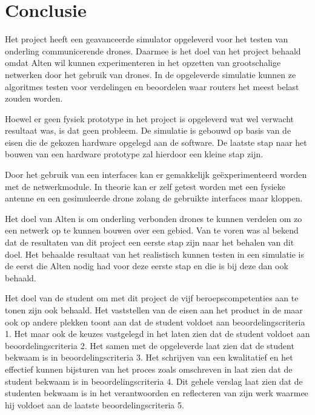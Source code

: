 \documentclass[a4paper, 11pt, oneside]{report}
\begin{document}
\chapter{Conclusie}\label{sec:conclusie}
Het project heeft een geavanceerde simulator opgeleverd voor het testen van onderling communicerende drones.
Daarmee is het doel van het project behaald omdat Alten wil kunnen experimenteren in het opzetten van grootschalige netwerken door het gebruik van drones.
In de opgeleverde simulatie kunnen ze algoritmes testen voor verdelingen en beoordelen waar routers het meest belast zouden worden.

Hoewel er geen fysiek prototype in het project is opgeleverd wat wel verwacht resultaat was, is dat geen probleem. 
De simulatie is gebouwd op basis van de eisen die de gekozen hardware opgelegd aan de software.
De laatste stap naar het bouwen van een hardware prototype zal hierdoor een kleine stap zijn.
 
Door het gebruik van een interfaces kan er gemakkelijk geëxperimenteerd worden met de netwerkmodule.
In theorie kan er zelf getest worden met een fysieke antenne en een gesimuleerde drone zolang de gebruikte interfaces maar kloppen.

Het doel van Alten is om onderling verbonden drones te kunnen verdelen om zo een netwerk op te kunnen bouwen over een gebied.
Van te voren was al bekend dat de resultaten van dit project een eerste stap zijn naar het behalen van dit doel.
Het behaalde resultaat van het realistisch kunnen testen in een simulatie is de eerst die Alten nodig had voor deze eerste stap en die is bij deze dan ook behaald.

Het doel van de student om met dit project de vijf beroepscompetenties aan te tonen zijn ook behaald. Het vaststellen van de eisen aan het product in de  maar ook op andere plekken toont aan dat de student voldoet aan beoordelingscriteria 1. Het  maar ook de keuzes vastgelegd in het  laten zien dat de student voldoet aan beoordelingscriteria 2. Het  samen met de opgeleverde  laat zien dat de student bekwaam is in beoordelingscriteria 3. Het schrijven van een kwalitatief  en het effectief kunnen bijsturen van het proces zoals omschreven in  laat zien dat de student bekwaam is in beoordelingscriteria 4.
Dit gehele verslag laat zien dat de studenten bekwaam is in het verantwoorden en reflecteren van zijn werk waarmee hij voldoet aan de laatste beoordelingscriteria 5.
\end{document}
